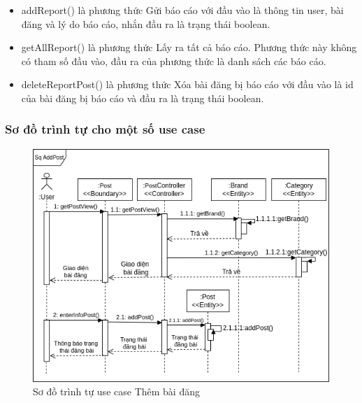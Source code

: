 \documentclass[../DoAn.tex]{subfiles}
\begin{document}
\begin{itemize}
        \begin{itemize}
            \item addReport() là phương thức Gửi báo cáo với đầu vào là thông tin user, bài đăng và lý do báo cáo, nhắn đầu ra là trạng thái boolean.
            \item getAllReport() là phương thức Lấy ra tất cả báo cáo. Phương thức này không có tham số đầu vào, đầu ra của phương thức là danh sách các báo cáo.
            \item deleteReportPost() là phương thức Xóa bài đăng bị báo cáo với đầu vào là id của bài đăng bị báo cáo và đầu ra là trạng thái boolean.
        \end{itemize}
    
\end{itemize}
\subsubsection{Sơ đồ trình tự cho một số use case}
\begin{figure}[H]
    \centering
    \includegraphics[width=0.85\linewidth]{Hinhve/PostSequence.png}
    \caption{Sơ đồ trình tự use case Thêm bài đăng}
    \label{fig:Fig1}
\end{figure}
\end{document}
